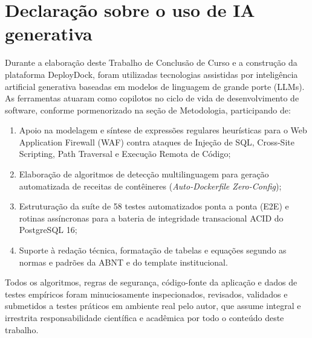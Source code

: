 
\section*{Declaração sobre o uso de IA generativa}
\label{sec:declaracao-uso-ia}

Durante a elaboração deste Trabalho de Conclusão de Curso e a construção da plataforma DeployDock, foram utilizadas tecnologias assistidas por inteligência artificial generativa baseadas em modelos de linguagem de grande porte (LLMs). As ferramentas atuaram como copilotos no ciclo de vida de desenvolvimento de software, conforme pormenorizado na seção de Metodologia, participando de:
\begin{enumerate}
    \item Apoio na modelagem e síntese de expressões regulares heurísticas para o Web Application Firewall (WAF) contra ataques de Injeção de SQL, Cross-Site Scripting, Path Traversal e Execução Remota de Código;
    \item Elaboração de algoritmos de detecção multilinguagem para geração automatizada de receitas de contêineres (\textit{Auto-Dockerfile Zero-Config});
    \item Estruturação da suíte de 58 testes automatizados ponta a ponta (E2E) e rotinas assíncronas para a bateria de integridade transacional ACID do PostgreSQL 16;
    \item Suporte à redação técnica, formatação de tabelas e equações segundo as normas e padrões da ABNT e do template institucional.
\end{enumerate}

Todos os algoritmos, regras de segurança, código-fonte da aplicação e dados de testes empíricos foram minuciosamente inspecionados, revisados, validados e submetidos a testes práticos em ambiente real pelo autor, que assume integral e irrestrita responsabilidade científica e acadêmica por todo o conteúdo deste trabalho.
